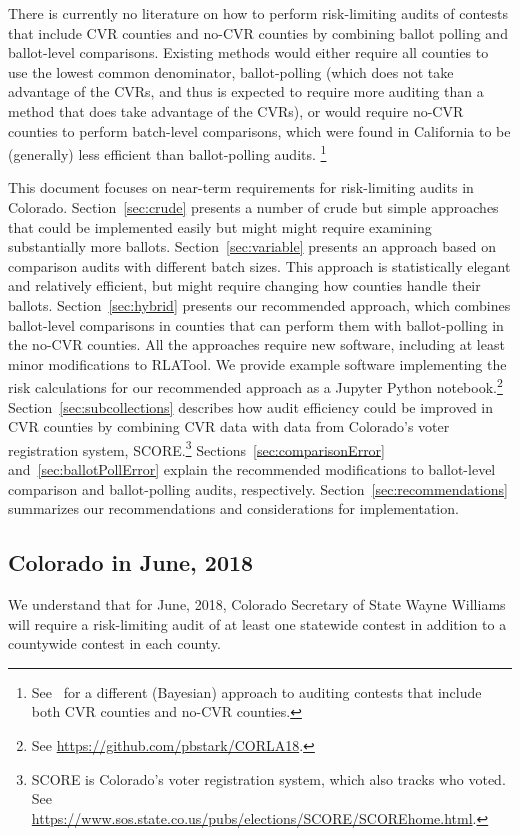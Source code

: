 \documentclass[12pt]{article}
\begin{document}
There is currently no literature on how to perform risk-limiting audits 
of contests that include CVR counties and no-CVR counties by combining
ballot polling and ballot-level comparisons.
Existing methods would either require all counties to use the lowest
common denominator, ballot-polling (which does not take advantage of the CVRs,
and thus is expected to require more auditing than a method that does take
advantage of the CVRs), or would
require no-CVR counties to perform batch-level comparisons, which were found in
California to be (generally) less efficient than ballot-polling audits.%
\footnote{%
  See~\cite{Rivest-2018-bayesian-tabulation-audits}
  for a different (Bayesian) approach to auditing contests that include both CVR counties
  and no-CVR counties.
  }

This document focuses on near-term requirements for risk-limiting audits in Colorado.
Section~\ref{sec:crude} presents a number of crude but simple approaches 
that could be implemented easily
but might might require examining substantially more ballots.
Section~\ref{sec:variable}
presents an approach based on comparison audits with different batch sizes.
This approach is statistically elegant and relatively efficient, but might require changing how counties
handle their ballots.
Section~\ref{sec:hybrid} presents our recommended approach, which combines ballot-level
comparisons in counties that can perform them with ballot-polling in the no-CVR counties.
All the approaches require new software, including at least minor modifications to RLATool.
We provide example software implementing the risk calculations for
our recommended approach as a Jupyter Python notebook.\footnote{%
 See \url{https://github.com/pbstark/CORLA18}.
}
Section~\ref{sec:subcollections}
describes how audit efficiency could be improved in CVR counties by combining CVR
data with data from Colorado's voter registration system, SCORE.\footnote{%
  SCORE is Colorado's voter registration system, which also tracks who voted.
  See \url{https://www.sos.state.co.us/pubs/elections/SCORE/SCOREhome.html}.
} 
Sections~\ref{sec:comparisonError} and~\ref{sec:ballotPollError} explain the recommended
modifications to ballot-level comparison and ballot-polling audits, respectively. 
Section~\ref{sec:recommendations} summarizes our recommendations and
considerations for implementation.

\subsection{Colorado in June, 2018}
We understand that for June, 2018, Colorado Secretary of State Wayne Williams will require
a risk-limiting audit of at least one statewide contest in addition
to a countywide contest in each county.
\end{document}
